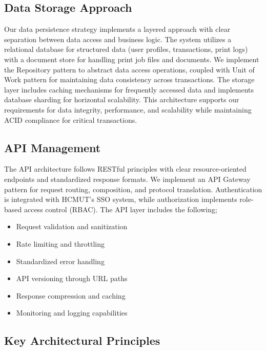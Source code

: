 \documentclass[a4paper]{report}
\begin{document}
\subsection{Data Storage Approach} 

Our data persistence strategy implements a layered approach with clear separation between data access and business logic. The system utilizes a relational database for structured data (user profiles, transactions, print logs) with a document store for handling print job files and documents. We implement the Repository pattern to abstract data access operations, coupled with Unit of Work pattern for maintaining data consistency across transactions. The storage layer includes caching mechanisms for frequently accessed data and implements database sharding for horizontal scalability. This architecture supports our requirements for data integrity, performance, and scalability while maintaining ACID compliance for critical transactions.

\subsection{API Management} 

The API architecture follows RESTful principles with clear resource-oriented endpoints and standardized response formats. We implement an API Gateway pattern for request routing, composition, and protocol translation. Authentication is integrated with HCMUT's SSO system, while authorization implements role-based access control (RBAC). The API layer includes the following;

\begin{multicols}{2}    
\begin{itemize}
    \item Request validation and sanitization
    \item Rate limiting and throttling
    \item Standardized error handling
    \item API versioning through URL paths
    \item Response compression and caching
    \item Monitoring and logging capabilities
\end{itemize}
\end{multicols}

\subsection{Key Architectural Principles}
\end{document}
